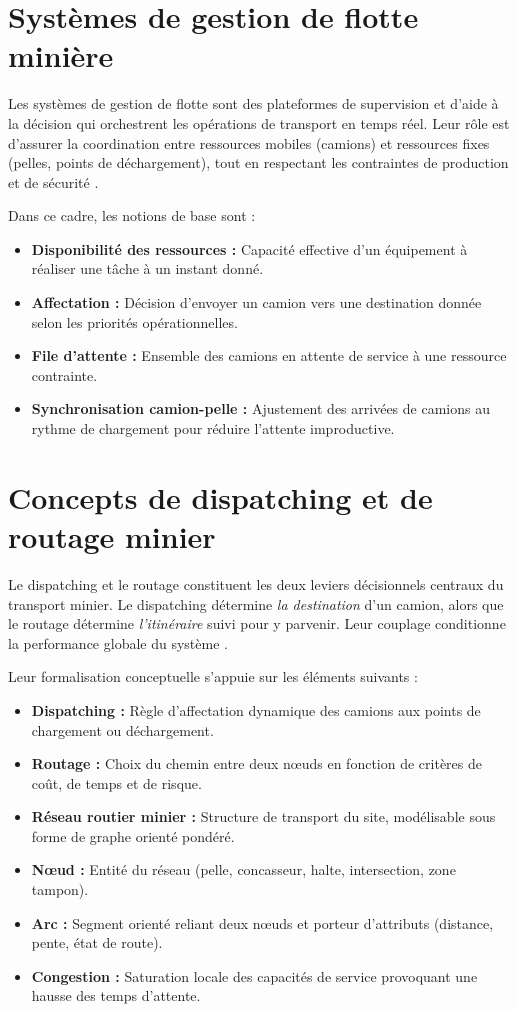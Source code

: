 \documentclass[11pt,a4paper]{report}
\begin{document}
\section{Systèmes de gestion de flotte minière}
\label{sec:fms}

Les systèmes de gestion de flotte sont des plateformes de supervision et d'aide à la décision qui orchestrent les opérations de transport en temps réel. Leur rôle est d'assurer la coordination entre ressources mobiles (camions) et ressources fixes (pelles, points de déchargement), tout en respectant les contraintes de production et de sécurité \cite{Afrapoli2017, Alarie2002}.

Dans ce cadre, les notions de base sont :
\begin{itemize}
    \item \textbf{Disponibilité des ressources :} Capacité effective d'un équipement à réaliser une tâche à un instant donné.
    \item \textbf{Affectation :} Décision d'envoyer un camion vers une destination donnée selon les priorités opérationnelles.
    \item \textbf{File d'attente :} Ensemble des camions en attente de service à une ressource contrainte.
    \item \textbf{Synchronisation camion-pelle :} Ajustement des arrivées de camions au rythme de chargement pour réduire l'attente improductive.
\end{itemize}

\section{Concepts de dispatching et de routage minier}
\label{sec:heuristiques-classiques}

Le dispatching et le routage constituent les deux leviers décisionnels centraux du transport minier. Le dispatching détermine \textit{la destination} d'un camion, alors que le routage détermine \textit{l'itinéraire} suivi pour y parvenir. Leur couplage conditionne la performance globale du système \cite{Alarie2002, MarceloMorettiFioroni2008, FSoumis1989}.

Leur formalisation conceptuelle s'appuie sur les éléments suivants :
\begin{itemize}
    \item \textbf{Dispatching :} Règle d'affectation dynamique des camions aux points de chargement ou déchargement.
    \item \textbf{Routage :} Choix du chemin entre deux nœuds en fonction de critères de coût, de temps et de risque.
    \item \textbf{Réseau routier minier :} Structure de transport du site, modélisable sous forme de graphe orienté pondéré.
    \item \textbf{Nœud :} Entité du réseau (pelle, concasseur, halte, intersection, zone tampon).
    \item \textbf{Arc :} Segment orienté reliant deux nœuds et porteur d'attributs (distance, pente, état de route).
    \item \textbf{Congestion :} Saturation locale des capacités de service provoquant une hausse des temps d'attente.
\end{itemize}
\end{document}
